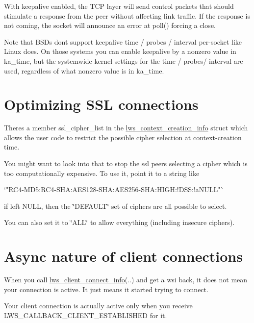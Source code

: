 With keepalive enabled, the T\+CP layer will send control packets that should stimulate a response from the peer without affecting link traffic. If the response is not coming, the socket will announce an error at {\ttfamily poll()} forcing a close.

Note that B\+S\+Ds don\textquotesingle{}t support keepalive time / probes / interval per-\/socket like Linux does. On those systems you can enable keepalive by a nonzero value in {\ttfamily ka\+\_\+time}, but the systemwide kernel settings for the time / probes/ interval are used, regardless of what nonzero value is in {\ttfamily ka\+\_\+time}.\hypertarget{md_README.coding_sslopt}{}\section{Optimizing S\+S\+L connections}\label{md_README.coding_sslopt}
There\textquotesingle{}s a member {\ttfamily ssl\+\_\+cipher\+\_\+list} in the {\ttfamily \hyperlink{structlws__context__creation__info}{lws\+\_\+context\+\_\+creation\+\_\+info}} struct which allows the user code to restrict the possible cipher selection at context-\/creation time.

You might want to look into that to stop the ssl peers selecting a cipher which is too computationally expensive. To use it, point it to a string like \begin{DoxyVerb}    `"RC4-MD5:RC4-SHA:AES128-SHA:AES256-SHA:HIGH:!DSS:!aNULL"`
\end{DoxyVerb}


if left {\ttfamily N\+U\+LL}, then the \char`\"{}\+D\+E\+F\+A\+U\+L\+T\char`\"{} set of ciphers are all possible to select.

You can also set it to {\ttfamily \char`\"{}\+A\+L\+L\char`\"{}} to allow everything (including insecure ciphers).\hypertarget{md_README.coding_clientasync}{}\section{Async nature of client connections}\label{md_README.coding_clientasync}
When you call {\ttfamily \hyperlink{structlws__client__connect__info}{lws\+\_\+client\+\_\+connect\+\_\+info}(..)} and get a {\ttfamily wsi} back, it does not mean your connection is active. It just means it started trying to connect.

Your client connection is actually active only when you receive {\ttfamily L\+W\+S\+\_\+\+C\+A\+L\+L\+B\+A\+C\+K\+\_\+\+C\+L\+I\+E\+N\+T\+\_\+\+E\+S\+T\+A\+B\+L\+I\+S\+H\+ED} for it.

